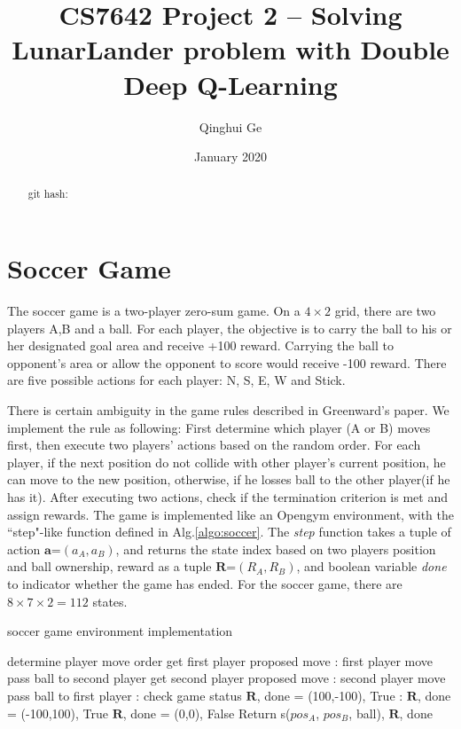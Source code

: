 \documentclass[conference]{IEEEtran}
\title{CS7642 Project 2 -- Solving LunarLander problem with Double Deep Q-Learning}
\author{Qinghui Ge}
\date{January 2020}
\begin{document}
	
	\maketitle
	
\begin{abstract}

	
	git hash: 
\end{abstract}
	
	
\section{Soccer Game}
The soccer game is a two-player zero-sum game. On a $4\times2$ grid, there are two players A,B and a ball. For each player, the objective is to carry the ball to his or her designated goal area and receive +100 reward. Carrying the ball to opponent's area or allow the opponent to score would receive -100 reward. There are five possible actions for each player: N, S, E, W and Stick. 

There is certain ambiguity in the game rules described in Greenward's paper. We implement the rule as following: First determine which player (A or B) moves first, then execute two players' actions based on the random order. For each player, if the next position do not collide with other player's current position, he can move to the new position, otherwise, if he losses ball to the other player(if he has it). After executing two actions, check if the termination criterion is met and assign rewards. The game is implemented like an Opengym environment, with the ``step"-like function defined in Alg.\ref{algo:soccer}. The \textit{step} function takes a tuple of action $\mathbf{a}$=$(a_A,a_B)$, and returns the state index based on two players position and ball ownership, reward as a tuple $\mathbf{R}$=$(R_A,R_B)$, and boolean variable \textit{done} to indicator whether the game has ended. For the soccer game, there are $8\times7\times2=112$ states.

\begin{algorithm}[h!]
	\caption{soccer game environment implementation}
	\begin{algorithmic}
		\State determine player move order
		\State get first player proposed move
		:
			\State first player move
			\State pass ball to second player
		\EndIf
		\State get second player proposed move
		:
		\State second player move
		\State pass ball to first player
		\EndIf
		: 		\Comment check game status
			\State $\mathbf{R}$, done = (100,-100), True
		:
			\State $\mathbf{R}$, done = (-100,100), True
		\Else
			\State $\mathbf{R}$, done = (0,0), False
		\EndIf
		\State Return s($pos_A$, $pos_B$, ball), $\mathbf{R}$, done
		\EndFunction
	\end{algorithmic}
	\label{algo:soccer}
\end{algorithm}
\end{document}
